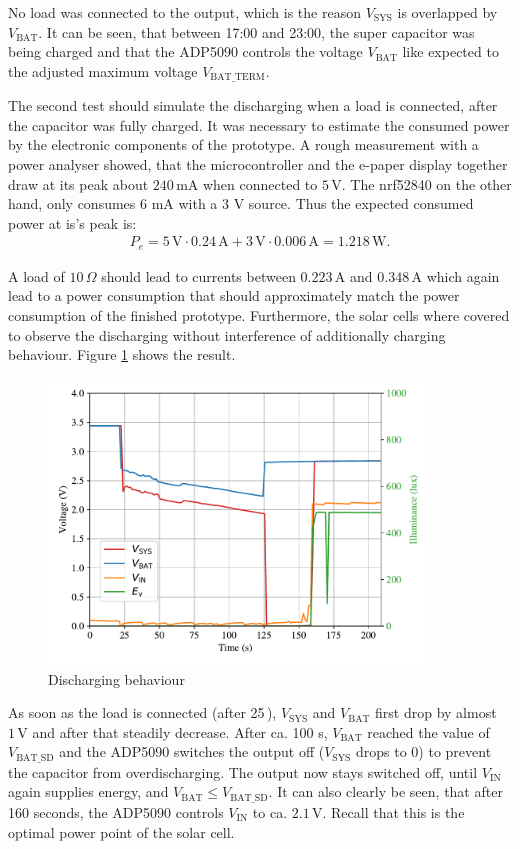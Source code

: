 No load was connected to the output, which is the reason $V_{\text{SYS}}$ is overlapped by $V_{\text{BAT}}$.
It can be seen, that between 17:00 and 23:00, the super capacitor was being charged and
that the ADP5090 controls the voltage $V_{\text{BAT}}$ like expected to the adjusted maximum voltage $V_{\text{BAT\_TERM}}$.

The second test should simulate the discharging when a load is connected, after the capacitor was fully charged.
It was necessary to estimate the consumed power by the electronic components of the prototype.
A rough measurement with a power analyser showed, that the microcontroller and the e-paper display together draw at its peak about $240\,\text{mA}$ when connected to $5\,\text{V}$. The nrf52840 on the other hand, only consumes 6 mA with a 3 V source. Thus the expected consumed power at is's peak is:
\begin{align}
	P_{e} = 5\,\text{V}\cdot 0.24\,\text{A} + 3\,\text{V}\cdot 0.006\,\text{A} = 1.218\,\text{W}.
\end{align}
  

A load of $10\,\Omega$ should lead to currents between $0.223\,\text{A}$ and $0.348\,\text{A}$ which again lead to a power consumption that should approximately match the power consumption of the finished prototype.
Furthermore, the solar cells where covered to observe the discharging without interference of additionally charging behaviour.
Figure \ref{development:discharge} shows the result.
 
\begin{figure}[ht]
	\centering
	\includegraphics[width=0.9\textwidth]{4-development/hardware/graphics/entladen.pdf}
	\caption{Discharging behaviour\label{development:discharge}}
\end{figure}

As soon as the load is connected (after 25\,), $V_{\text{SYS}}$ and $V_{\text{BAT}}$ first drop by almost $1\,\text{V}$ and after that steadily decrease.
After ca. 100 s, $V_{\text{BAT}}$ reached the value of $V_{\text{BAT\_SD}}$ and the ADP5090 switches the output off ($V_{\text{SYS}}$ drops to 0) to prevent the capacitor from overdischarging.
The output now stays switched off, until $V_{\text{IN}}$ again supplies energy, and $V_{\text{BAT}} \le V_{\text{BAT\_SD}}$.
It can also clearly be seen, that after 160 seconds, the ADP5090 controls $V_{\text{IN}}$ to ca. $2.1\,\text{V}$. Recall that this is the optimal power point of the solar cell.
